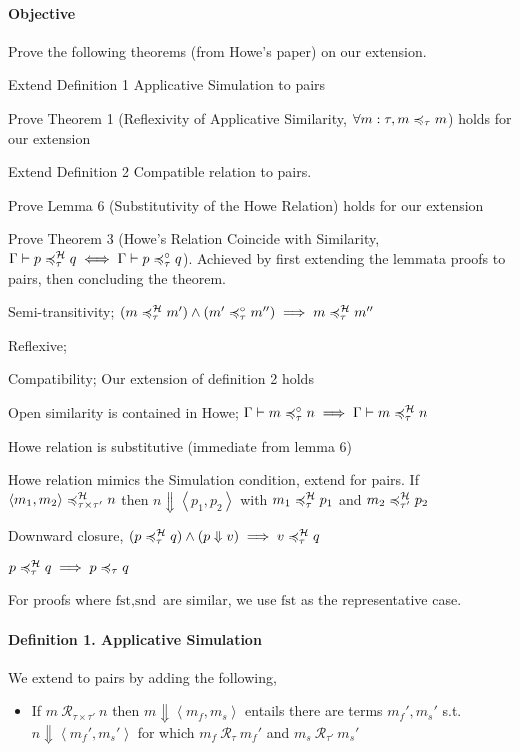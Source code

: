 \documentclass{article}
\begin{document}
\paragraph{Objective} Prove the following theorems (from Howe's paper) on our extension. \begin{checklist}
    \item[\done] Extend Definition 1 Applicative Simulation to pairs
    \item[\done] Prove Theorem 1 (Reflexivity of Applicative Similarity, \(\forall m:\tau,m\asim m\)) holds for our extension
    \item[\done] Extend Definition 2 Compatible relation to pairs.
    \item[\done] Prove Lemma 6 (Substitutivity of the Howe Relation) holds for our extension
    \item Prove Theorem 3 (Howe's Relation Coincide with Similarity, \(\Gamma\vdash p\howe q\iff \Gamma\vdash p\osim q\)). Achieved by first extending the lemmata proofs to pairs, then concluding the theorem. \begin{checklist}
        \item[\done] Semi-transitivity; \((m\howe m')\wedge(m'\osim m'')\implies m\howe m''\)
        \item[\done] Reflexive;
        \item Compatibility; Our extension of definition 2 holds
        \item Open similarity is contained in Howe; \(\Gamma\vdash m\osim n\implies\Gamma\vdash m\howe n\)
        \item[\done] Howe relation is substitutive (immediate from lemma 6)
        \item Howe relation mimics the Simulation condition, extend for pairs. If \(\left\langle m_1,m_2 \right\rangle \howe[\tau\times\tau'] n\) then \(n\Downarrow \left\langle p_1,p_2 \right\rangle \) with \(m_1\howe p_1\) and \(m_2\howe[\tau'] p_2\)
        \item Downward closure, \((p\howe q)\wedge (p\Downarrow v)\implies v\howe q\)
        \item \(p\howe q \implies p\asim q\)
    \end{checklist}
\end{checklist}
For proofs where \(\text{fst},\text{snd}\) are similar, we use \(\text{fst}\) as the representative case.

\paragraph{Definition 1. Applicative Simulation} We extend to pairs by adding the following, \begin{itemize}
    \item If \(m ~\mathcal{R}_{\tau\times\tau'}~n\) then \(m\Downarrow \left\langle m_f,m_s \right\rangle \) entails there are terms \(m_f',m_s'\) s.t. \(n\Downarrow \left\langle m_f',m_s' \right\rangle \) for which \(m_f ~\mathcal{R}_{\tau}~m_f'\) and \(m_s ~\mathcal{R}_{\tau'}~m_s'\)
\end{itemize}
\end{document}
